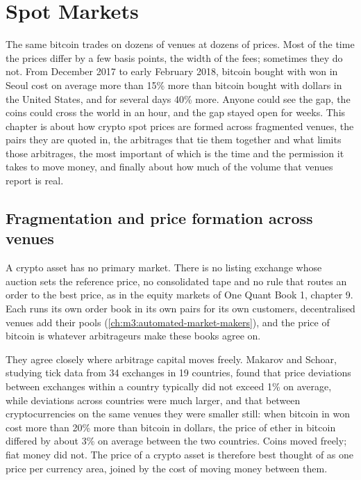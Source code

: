 \chapter{Spot Markets}\label{ch:m3:spot-markets}

The same bitcoin trades on dozens of venues at dozens of prices. Most of the time the prices differ by
a few basis points, the width of the fees; sometimes they do not. From December 2017 to early February
2018, bitcoin bought with won in Seoul cost on average more than 15\% more than bitcoin bought with
dollars in the United States, and for several days 40\% more. Anyone could see the gap, the coins
could cross the world in an hour, and the gap stayed open for weeks. This chapter is about how crypto
spot prices are formed across fragmented venues, the pairs they are quoted in, the arbitrages that
tie them together and what limits those arbitrages, the most important of which is the time and the
permission it takes to move money, and finally about how much of the volume that venues report is real.

\section{Fragmentation and price formation across venues}

A crypto asset has no primary market. There is no listing exchange whose auction sets the reference
price, no consolidated tape and no rule that routes an order to the best price, as in the equity
markets of One Quant Book 1, chapter 9. Each  runs its own order book in its own
pairs for its own customers, decentralised venues add their pools (\cref{ch:m3:automated-market-makers}),
and the price of bitcoin is whatever arbitrageurs make these books agree on.

They agree closely where arbitrage capital moves freely. Makarov and Schoar, studying tick data from 34 exchanges in 19
countries, found that price deviations between exchanges within a country typically did
not exceed 1\% on average, while deviations across countries were much larger, and that between
cryptocurrencies on the same venues they were smaller still: when bitcoin in won cost more than 20\% more
than bitcoin in dollars, the price of ether in bitcoin differed by about 3\% on average between the two
countries. Coins moved freely; fiat money did not. The price of a crypto asset is therefore best thought
of as one price per currency area, joined by the cost of moving money between them.

